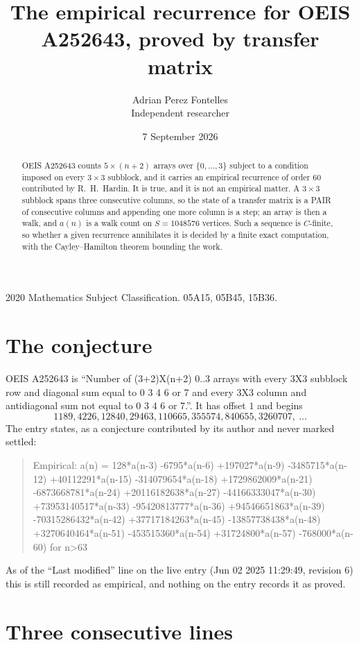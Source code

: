 \documentclass[11pt,a4paper]{article}
\title{The empirical recurrence for OEIS A252643, proved by transfer matrix}
\author{Adrian Perez Fontelles\\ \small Independent researcher}
\date{7 September 2026}
\theoremstyle{plain}
\theoremstyle{definition}
\begin{document}
\maketitle

\begin{abstract}
OEIS A252643 counts $5\times(n+2)$ arrays over $\{0,\dots,3\}$ subject to a condition imposed on
every $3\times3$ subblock, and it carries an empirical recurrence of order $60$
contributed by R.~H.~Hardin. It is true, and it is not an empirical matter. A $3\times3$
subblock spans three consecutive columns, so the state of a transfer matrix is a PAIR of
consecutive columns and appending one more column is a step; an array is then a walk, and
$a(n)$ is a walk count on $S=1048576$ vertices. Such a sequence is $C$-finite, so whether a given
recurrence annihilates it is decided by a finite exact computation, with the Cayley--Hamilton
theorem bounding the work.
\end{abstract}

\noindent\small 2020 Mathematics Subject Classification. 05A15, 05B45, 15B36.\normalsize

\section{The conjecture}

OEIS A252643 is ``Number of (3+2)X(n+2) 0..3 arrays with every 3X3 subblock row and diagonal sum equal to 0 3 4 6 or 7 and every 3X3 column and antidiagonal sum not equal to 0 3 4 6 or 7.''. It has offset $1$ and begins
\[
1189, 4226, 12840, 29463, 110665, 355574, 840655, 3260707,\ \dots
\]
The entry states, as a conjecture contributed by its author and never marked settled:
\begin{quote}
Empirical: a(n) = 128*a(n-3) -6795*a(n-6) +197027*a(n-9) -3485715*a(n-12) +40112291*a(n-15) -314079654*a(n-18) +1729862009*a(n-21) -6873668781*a(n-24) +20116182638*a(n-27) -44166333047*a(n-30) +73953140517*a(n-33) -95420813777*a(n-36) +94546651863*a(n-39) -70315286432*a(n-42) +37717184263*a(n-45) -13857738438*a(n-48) +3270640464*a(n-51) -453515360*a(n-54) +31724800*a(n-57) -768000*a(n-60) for n>63
\end{quote}
As of the ``Last modified'' line on the live entry (Jun 02 2025 11:29:49, revision 6) this is still
recorded as empirical, and nothing on the entry records it as proved.

\section{Three consecutive lines}
\end{document}
